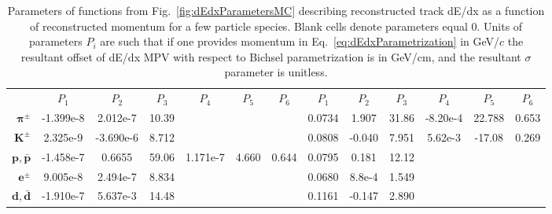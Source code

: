 \begin{table}[hb!]
{\begin{tabular}{r||c|c|c|c|c|c||c|c|c|c|c|c}
  & $P_{1}$ & $P_{2}$ & $P_{3}$ & $P_{4}$ & $P_{5}$ & $P_{6}$ & $P_{1}$ & $P_{2}$ & $P_{3}$ & $P_{4}$ & $P_{5}$ & $P_{6}$ \\ \Xhline{2\arrayrulewidth}
 $\bm{\pi^{\pm}}$ & \scriptsize -1.399e-8 & \scriptsize 2.012e-7 & \scriptsize10.39 & \scriptsize&             \scriptsize&                \scriptsize&         \scriptsize 0.0734 & \scriptsize1.907 & \scriptsize31.86 & \scriptsize-8.20e-4 & \scriptsize 22.788 & \scriptsize 0.653\\ \hline
 $\bm{K^{\pm}}$ & \scriptsize    2.325e-9 & \scriptsize -3.690e-6 & \scriptsize 8.712 & \scriptsize&           \scriptsize&               \scriptsize&          \scriptsize 0.0808 &  \scriptsize -0.040 & \scriptsize7.951 & \scriptsize 5.62e-3 & \scriptsize -17.08 &  \scriptsize 0.269\\ \hline
 $\bm{p,\bar{p}}$ & \scriptsize -1.458e-7 & \scriptsize 0.6655 &   \scriptsize59.06 & \scriptsize 1.171e-7 &    \scriptsize 4.660 &       \scriptsize 0.644 &   \scriptsize0.0795 & \scriptsize 0.181 & \scriptsize12.12 & \scriptsize& \scriptsize& \scriptsize\\ \hline
 $\bm{e^{\pm}}$ & \scriptsize   9.005e-8 &  \scriptsize 2.494e-7 & \scriptsize 8.834 & \scriptsize&              \scriptsize&              \scriptsize&          \scriptsize 0.0680 & \scriptsize 8.8e-4 & \scriptsize 1.549 & \scriptsize& \scriptsize& \scriptsize\\ \hline
 $\bm{d,\bar{d}}$ & \scriptsize -1.910e-7 & \scriptsize 5.637e-3 &  \scriptsize 14.48 & \scriptsize&               \scriptsize&              \scriptsize&          \scriptsize 0.1161 & \scriptsize -0.147 & \scriptsize 2.890 & \scriptsize& \scriptsize& \scriptsize%
\end{tabular}%
}\vspace{-7pt}\caption[Parameters of functions from Fig.~\ref{fig:dEdxParametersMC} describing reconstructed track dE/dx as a function of reconstructed momentum for a few particle species (STARsim MC).]{Parameters of functions from Fig.~\ref{fig:dEdxParametersMC} describing reconstructed track dE/dx as a function of reconstructed momentum for a few particle species. Blank cells denote parameters equal 0. Units of parameters $P_{i}$ are such that if one provides momentum in Eq.~\eqref{eq:dEdxParametrization} in GeV/$c$ the resultant offset of dE/dx MPV with respect to Bichsel parametrization is in GeV/cm, and the resultant $\sigma$ parameter is unitless.}\label{tab:dEdxParameters}
\end{table}%
